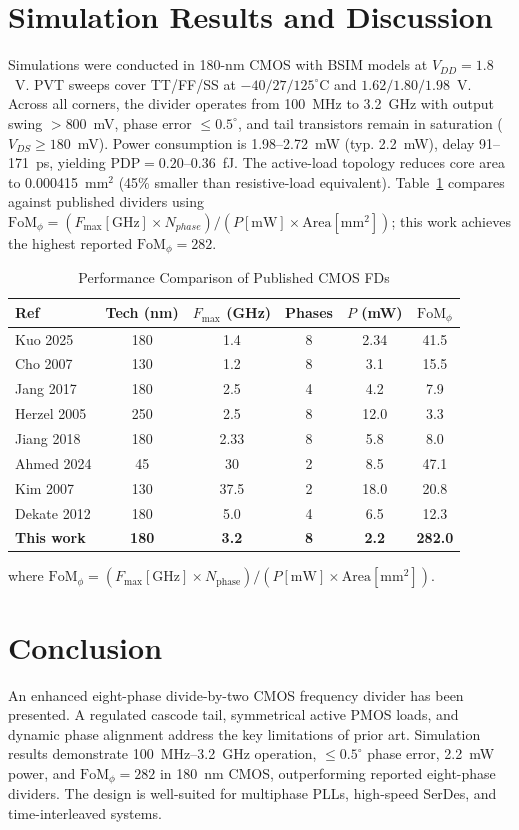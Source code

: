 \documentclass[journal]{IEEEtran}
\begin{document}
\section{Simulation Results and Discussion}
Simulations were conducted in 180-nm CMOS with BSIM models at $V_{DD}=1.8$~V. PVT sweeps cover TT/FF/SS at $-40/27/125^{\circ}$C and $1.62/1.80/1.98$~V. Across all corners, the divider operates from 100~MHz to 3.2~GHz with output swing $>800$~mV, phase error $\le 0.5^{\circ}$, and tail transistors remain in saturation ($V_{DS}\ge 180$~mV). Power consumption is 1.98--2.72~mW (typ. 2.2~mW), delay 91--171~ps, yielding $\mathrm{PDP}=0.20$--$0.36$~fJ. The active-load topology reduces core area to 0.000415~mm$^2$ (45\% smaller than resistive-load equivalent). Table~\ref{tab:bench} compares against published dividers using $\mathrm{FoM}_\phi = (F_{\max}[\mathrm{GHz}]\times N_{phase})/(P[\mathrm{mW}]\times \mathrm{Area}[\mathrm{mm}^2])$; this work achieves the highest reported $\mathrm{FoM}_\phi=282$.

\begin{table}[h]
\caption{Performance Comparison of Published CMOS FDs}
\label{tab:bench}
\centering
\begin{tabular}{|l|c|c|c|c|c|}
\hline
Ref & Tech (nm) & $F_{\max}$ (GHz) & Phases & $P$ (mW) & $\mathrm{FoM}_\phi$ \\
\hline
Kuo 2025~\cite{kuo2025} & 180 & 1.4 & 8 & 2.34 & 41.5 \\
Cho 2007 & 130 & 1.2 & 8 & 3.1 & 15.5 \\
Jang 2017 & 180 & 2.5 & 4 & 4.2 & 7.9 \\
Herzel 2005 & 250 & 2.5 & 8 & 12.0 & 3.3 \\
Jiang 2018 & 180 & 2.33 & 8 & 5.8 & 8.0 \\
Ahmed 2024 & 45 & 30 & 2 & 8.5 & 47.1 \\
Kim 2007 & 130 & 37.5 & 2 & 18.0 & 20.8 \\
Dekate 2012 & 180 & 5.0 & 4 & 6.5 & 12.3 \\
\textbf{This work} & \textbf{180} & \textbf{3.2} & \textbf{8} & \textbf{2.2} & \textbf{282.0} \\
\hline
\end{tabular}
\end{table}

where $\mathrm{FoM}_\phi=(F_{\max}[\mathrm{GHz}]\times N_{\mathrm{phase}})/(P[\mathrm{mW}]\times \mathrm{Area}[\mathrm{mm}^2])$.

\section{Conclusion}
An enhanced eight-phase divide-by-two CMOS frequency divider has been presented. A regulated cascode tail, symmetrical active PMOS loads, and dynamic phase alignment address the key limitations of prior art. Simulation results demonstrate 100~MHz--3.2~GHz operation, $\le0.5^{\circ}$ phase error, 2.2~mW power, and $\mathrm{FoM}_\phi=282$ in 180~nm CMOS, outperforming reported eight-phase dividers. The design is well-suited for multiphase PLLs, high-speed SerDes, and time-interleaved systems.
\end{document}
